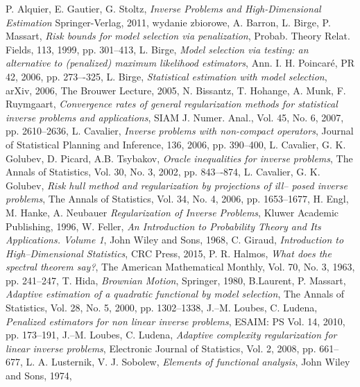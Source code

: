 \documentclass[man,mfiu]{mgrwms}
\begin{document}
\begin{thebibliography}{100}
 P. Alquier,	E. Gautier, G. Stoltz, \emph{Inverse Problems and High-Dimensional Estimation}	Springer-Verlag, 2011, wydanie zbiorowe,
 A. Barron, L. Birge, P. Massart, \emph{Risk bounds for model selection via penalization}, Probab. Theory Relat. Fields, 113, 1999, pp. 301--413,
 L. Birge, \emph{Model selection via testing: an alternative to (penalized) maximum likelihood estimators}, Ann. I. H. Poincaré, PR 42, 2006, pp. 273–-325,
 L. Birge, \emph{Statistical estimation with model selection}, arXiv, 2006, The Brouwer Lecture, 2005,
 N. Bissantz, T. Hohange, A. Munk, F. Ruymgaart, \emph{Convergence rates of general regularization methods for statistical inverse problems and applications}, SIAM J. Numer. Anal., Vol. 45, No. 6, 2007, pp. 2610--2636,
  L. Cavalier, \emph{Inverse problems with non-compact operators}, Journal of Statistical Planning and
Inference, 136, 2006, pp. 390--400,
 L. Cavalier, G. K. Golubev, D. Picard, A.B. Tsybakov, \emph{Oracle inequalities for inverse problems}, The Annals of Statistics, Vol. 30, No. 3, 2002, pp. 843–-874,	
 L. Cavalier, G. K. Golubev, \emph{Risk hull method and regularization by projections of ill-- posed inverse problems}, The Annals of Statistics, Vol. 34, No. 4, 2006, pp. 1653--1677,
 H. Engl,	M. Hanke,	A. Neubauer	\emph{Regularization of Inverse Problems}, Kluwer Academic Publishing,	1996,
 W. Feller, \emph{An Introduction to Probability Theory and Its Applications. Volume 1}, John Wiley and Sons, 1968,
 C. Giraud, \emph{Introduction to High--Dimensional Statistics}, CRC Press, 2015,
  P. R. Halmos, \emph{What does the spectral theorem say?}, The American Mathematical Monthly, Vol. 70, No. 3, 1963, pp. 241--247,
 T. Hida, \emph{Brownian Motion}, Springer, 1980,
 B.Laurent, P. Massart, \emph{Adaptive estimation of a quadratic functional by model selection}, The Annals of Statistics, Vol. 28, No. 5, 2000, pp. 1302--1338,
 J.--M. Loubes, C. Ludena, \emph{Penalized estimators for non linear inverse problems}, ESAIM: PS Vol. 14, 2010, pp. 173--191,
 J.--M. Loubes, C. Ludena, \emph{Adaptive complexity regularization for linear inverse problems}, Electronic Journal of Statistics, Vol. 2, 2008, pp. 661--677, 
 L. A. Lusternik, V. J. Sobolew, \emph{Elements of functional analysis}, John Wiley and Sons, 1974,

\end{thebibliography}
\end{document}
